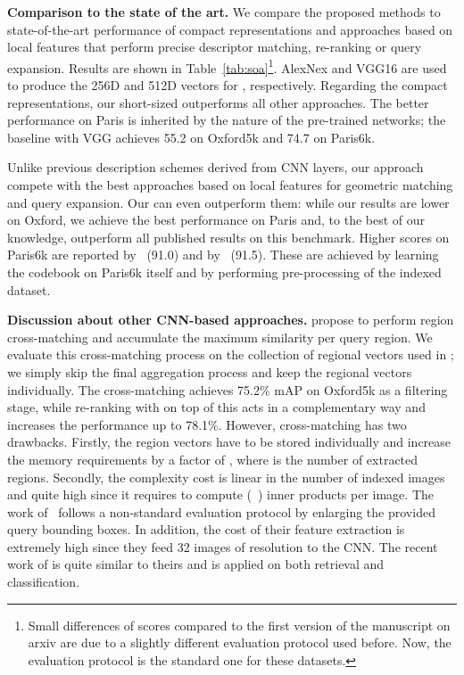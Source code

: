 \textbf{Comparison to the state of the art.}
We compare the proposed methods to state-of-the-art performance of compact representations and approaches based on local features that perform precise descriptor matching, re-ranking or query expansion.
Results are shown in Table~\ref{tab:soa}\footnote{Small differences of scores compared to the first version of the manuscript on arxiv are due to a slightly different evaluation protocol used before. Now, the evaluation protocol is the standard one for these datasets.}. AlexNex and VGG16 are used to produce the 256D and 512D vectors for \rfv, respectively.
Regarding the compact representations, our short-sized \rfv outperforms all other approaches.
The better performance on Paris is inherited by the nature of the pre-trained networks; the baseline \gfv with VGG achieves 55.2 on Oxford5k and 74.7 on Paris6k.

Unlike previous description schemes derived from CNN layers, our approach compete with the best
approaches based on local features for geometric matching and query expansion.
Our 
\deeploc can even outperform them: while our results are lower
on Oxford, we achieve the best performance on Paris and, to the best of our knowledge, outperform all published results on this benchmark.
Higher scores on Paris6k are reported by~\cite{AZ12} (91.0) and by~\cite{ZJS15} (91.5). These are achieved by learning the codebook on Paris6k itself and by performing pre-processing of the indexed dataset.


\textbf{Discussion about other CNN-based approaches.}
\cite{RSMC14} propose to perform region cross-matching and accumulate the maximum similarity per query region.
We evaluate this cross-matching process on the collection of regional vectors used in \rfv; we simply skip the final aggregation process and keep the regional vectors individually.
The cross-matching achieves 75.2\% mAP on Oxford5k as a filtering stage, while re-ranking with \deeploc on top of this acts in a complementary way and increases the performance up to 78.1\%. 
However, cross-matching has two drawbacks.
Firstly, the region vectors have to be stored individually and increase the memory requirements by a factor of , where  is the number of extracted regions.
Secondly, the complexity cost is linear in the number of indexed images and quite high since it requires to compute  (~\citep{RSMC14}) inner products per image.
The work of~\cite{RSMC14} follows a non-standard evaluation protocol by enlarging the provided query bounding boxes.
In addition, the cost of their feature extraction is extremely high since they feed 32 images of resolution  to the CNN.
The recent work of \cite{XTHZ15} is quite similar to theirs and is applied on both retrieval and classification.

